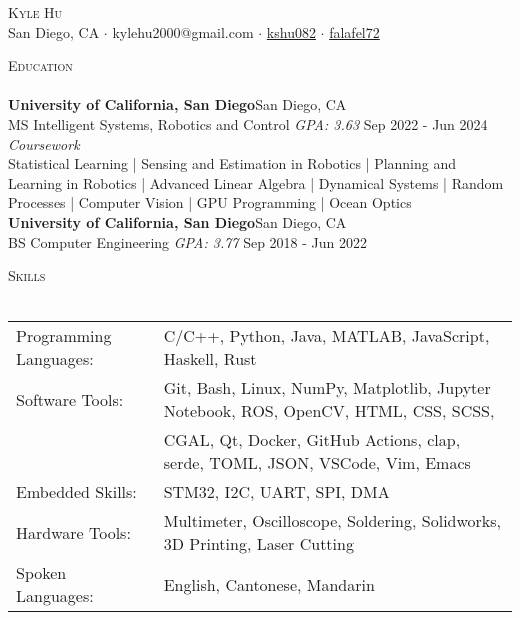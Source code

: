 \documentclass[a4paper]{article}
\newcommand{\lineunder} {
    \vspace*{-8pt} \\
    \hspace*{-18pt} \hrulefill \\
}
\newcommand{\header} [1] {
    {\hspace*{-18pt}\vspace*{6pt} \textsc{#1}}
    \vspace*{-6pt} \lineunder
}
\begin{document}

    

\begin{center}
	{\Huge \scshape {Kyle Hu}}\\
  \vspace{2mm}
	\faGlobe\:San Diego, CA
  $\cdot$ \faEnvelope\:kylehu2000@gmail.com
  $\cdot$ \faLinkedinSquare\:\href{https://www.linkedin.com/in/kshu082/}{kshu082}
  $\cdot$ \faGithubSquare\:\href{https://www.github.com/falafel72}{falafel72} \\
\end{center}

\begin{comment}
\header{Objective}
Looking for an entry-level full time job where I can fully utilize my
robotics education and systems experience.
\end{comment}
\header{Education}
\vspace{1mm}
\textbf{University of California, San Diego}\hfill San Diego, CA\\
MS Intelligent Systems, Robotics and Control \textit{GPA: 3.63} \hfill Sep 2022 - Jun 2024\\
\vspace{1mm}
\textit{Coursework} \\
Statistical Learning | Sensing and Estimation in Robotics | Planning and Learning in Robotics | Advanced Linear Algebra | Dynamical Systems | Random Processes | Computer Vision | GPU Programming | Ocean Optics\\
\vspace{2mm}
\textbf{University of California, San Diego}\hfill San Diego, CA\\
BS Computer Engineering \textit{GPA: 3.77} \hfill Sep 2018 - Jun 2022\\


\vspace{2mm}

\header{Skills}
\vspace{2mm}
\begin{tabular}{ l l }
	Programming Languages: & C/C++, Python, Java, MATLAB, JavaScript, Haskell, Rust  \\
  Software Tools:       & Git, Bash, Linux, NumPy, Matplotlib, Jupyter Notebook, ROS, OpenCV, HTML, CSS, SCSS, \\
   & CGAL, Qt, Docker, GitHub Actions, clap, serde, TOML, JSON, VSCode, Vim, Emacs \\
  Embedded Skills: & STM32, I2C, UART, SPI, DMA\\
  Hardware Tools: & Multimeter, Oscilloscope, Soldering, Solidworks, 3D Printing, Laser Cutting \\
	Spoken Languages:      & English, Cantonese, Mandarin                     \\
\end{tabular}
\vspace{2mm}
\end{document}
